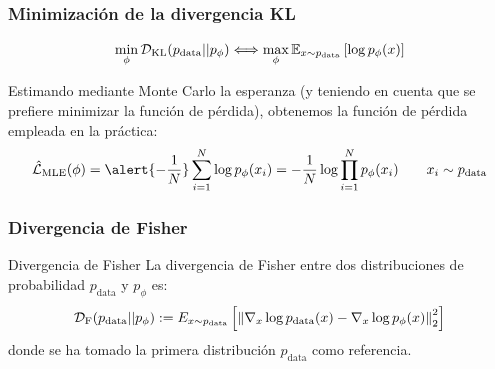 \documentclass{beamer}
\begin{document}
\begin{frame}
	\frametitle{Minimización de la divergencia KL}

	\begin{lemma}
		\begin{equation*}
			\min_{\phi} \mathcal{D}_{\text{KL}}(p_{\text{data}} || p_{\phi}) \Longleftrightarrow \max_{\phi} \mathbb{E}_{x \sim p_{\text{data}}} \left[ \log p_{\phi}(x) \right]
		\end{equation*}
	\end{lemma}

	\pause

	Estimando mediante \alert{Monte Carlo} la esperanza (y teniendo en cuenta que se prefiere \alert{minimizar} la función de pérdida), obtenemos la función de pérdida empleada en la práctica:
	\begin{equation*}
		\hat{\cc{L}}_{\text{MLE}}(\phi) = \alert{-\frac{1}{N}} \sum_{i=1}^{N} \log p_{\phi}(x_i)
		= - \frac{1}{N} \log \prod_{i=1}^{N} p_{\phi}(x_i)
		\qquad x_i \sim p_{\text{data}}
	\end{equation*}
\end{frame}


\begin{frame}
	\frametitle{Divergencia de Fisher}
	\begin{definitionblock}{Divergencia de Fisher}
		La divergencia de Fisher entre dos distribuciones de probabilidad $p_{\text{data}}$ y $p_{\phi}$ es:
		\begin{equation*}
			\mathcal{D}_{\text{F}}(p_{\text{data}} || p_{\phi}) := E_{x \sim p_{\text{data}}} \left[ \left\| \nabla_x \log p_{\text{data}}(x) - \nabla_x \log p_{\phi}(x) \right\|_2^2 \right]
		\end{equation*}
		donde se ha tomado la primera distribución $p_{\text{data}}$ como referencia.
	\end{definitionblock}
\end{frame}
\end{document}
